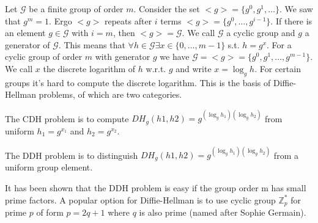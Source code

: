 Let $\mathcal{G}$ be a finite group 
of order $m$. Consider the set $<g> = \{g^0, g^1, \dots\}$.
We saw that $g^m = 1$. Ergo $<g>$ repeats 
after $i$ terms $<g> = \{g^0, \dots, g^{i - 1}\}$. 
If there is an element $g \in \mathcal{G}$ with 
$i = m$, then $<g> = \mathcal{G}$. 
We call $\mathcal{G}$ a cyclic group and $g$ a 
generator of $\mathcal{G}$. This means 
that $\forall h \in \mathcal{G} \exists x \in \{0, \dots, m - 1\}$
s.t. $h = g^x$. For a cyclic group of 
order $m$ with generator $g$ we have 
$\mathcal{G} = <g> = \{g^0, g^1, \dots, g^{m-1}\}$.
We call $x$ the discrete logarithm of $h$ 
w.r.t. $g$ and write $x = \log_g h$. 
For certain groups it's hard to compute 
the discrete logarithm. This is the basis 
of Diffie-Hellman problems, of which are two categories. 

The CDH problem is to compute $DH_g(h1, h2) = g^{(\log_g h_1)(\log_g h_2)}$ 
from uniform $h_1 = g^{x_1}$ and $h_2 = g^{x_2}$.

The DDH problem is to distinguish $DH_g(h1, h2) = g^{(\log_g h_1)(\log_g h_2)}$ 
from a uniform group element.

It has been shown that the DDH problem is easy if the group order m has small
prime factors. A popular option for Diffie-Hellman 
is to use cyclic group $\mathbb{Z}^*_p$
for prime $p$ of form
$p = 2q + 1$ where $q$ is also prime
(named after Sophie Germain).